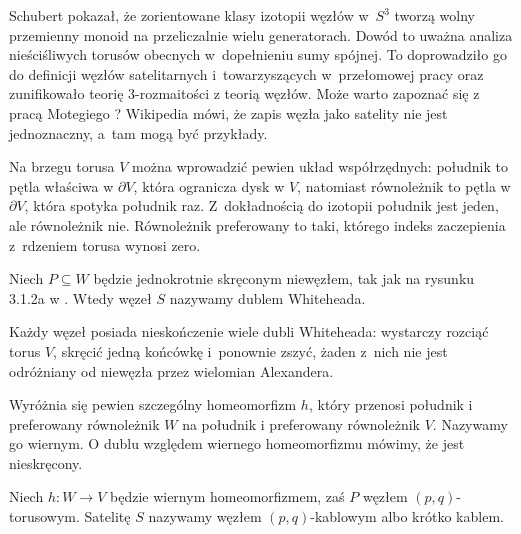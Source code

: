 Schubert pokazał, że zorientowane klasy izotopii węzłów w~$S^3$ tworzą wolny przemienny monoid na przeliczalnie wielu generatorach.
%
Dowód to uważna analiza nieściśliwych torusów obecnych w~dopełnieniu sumy spójnej.
To doprowadziło go do definicji węzłów satelitarnych i~towarzyszących w~przełomowej pracy \cite{schubert1953} oraz zunifikowało teorię 3-rozmaitości z teorią węzłów.
Może warto zapoznać się z pracą Motegiego \cite{motegi1997}?
Wikipedia mówi, że zapis węzła jako satelity nie jest jednoznaczny, a~tam mogą być przykłady.

Na brzegu torusa $V$ można wprowadzić pewien układ współrzędnych: południk to pętla właściwa w $\partial V$, która ogranicza dysk w $V$, natomiast równoleżnik to pętla w $\partial V$, która spotyka południk raz.
Z~dokładnością do izotopii południk jest jeden, ale równoleżnik nie.
Równoleżnik preferowany to taki, którego indeks zaczepienia z~rdzeniem torusa wynosi zero.

\begin{definition}
%
    Niech $P \subseteq W$ będzie jednokrotnie skręconym niewęzłem, tak jak na rysunku 3.1.2a w \cite[s. 32]{kawauchi1996}.
    Wtedy węzeł $S$ nazywamy dublem Whiteheada.
\end{definition}

Każdy węzeł posiada nieskończenie wiele dubli Whiteheada: wystarczy rozciąć torus $V$, skręcić jedną końcówkę i~ponownie zszyć, żaden z~nich nie jest odróżniany od niewęzła przez wielomian Alexandera.

Wyróżnia się pewien szczególny homeomorfizm $h$, który przenosi południk i preferowany równoleżnik $W$ na południk i preferowany równoleżnik $V$.
Nazywamy go wiernym.
O dublu względem wiernego homeomorfizmu mówimy, że jest nieskręcony.

\begin{definition}
%
    Niech $h \colon W \to V$ będzie wiernym homeomorfizmem, zaś $P$ węzłem $(p, q)$-torusowym.
    Satelitę $S$ nazywamy węzłem $(p, q)$-kablowym albo krótko kablem.
\end{definition}

